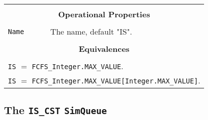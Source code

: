 \documentclass[12pt]{book}
\begin{document}
\begin{tabular}{|l|l|l|l|}
\hline
\multicolumn{4}{|c|}{} \\
\multicolumn{4}{|c|}{\bf Operational Properties} \\
\multicolumn{4}{|c|}{} \\
\hline
\lstinline|Name| & \multicolumn{3}{|l|}{The name, default "IS".} \\
\hline
\multicolumn{4}{|c|}{} \\
\multicolumn{4}{|c|}{\bf Equivalences} \\
\multicolumn{4}{|c|}{} \\
\hline
\multicolumn{4}{|l|}{\lstinline|IS| $=$ \lstinline|FCFS_Integer.MAX_VALUE|.} \\
\multicolumn{4}{|l|}{\lstinline|IS| $=$ \lstinline|FCFS_Integer.MAX_VALUE[Integer.MAX_VALUE]|.} \\
\hline
\end{tabular}

\subsection{The \lstinline{IS_CST} \lstinline{SimQueue}}
\end{document}
